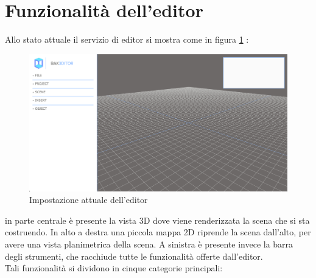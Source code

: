 \section{Funzionalità dell'editor}
\label{sec:chapter_creazione_scena_funzionalita_editor}

Allo stato attuale il servizio di editor si mostra come in figura \ref{fig:editor_1} :
\begin{figure}[h]
 \centering
 \includegraphics[width=1\linewidth]{images/chapter_creazione_scena/editor_1.png}\hfill
 \caption[Editor: stato attuale]{Impostazione attuale dell'editor}
 \label{fig:editor_1}
\end{figure}
in parte centrale è presente la vista 3D dove viene renderizzata la scena che si sta costruendo. In alto a destra una piccola mappa 2D riprende la scena dall’alto, per avere una vista planimetrica della scena. A sinistra è presente invece la barra degli strumenti, che racchiude tutte le funzionalità offerte dall’editor.
\\
Tali funzionalità si dividono in cinque categorie principali:
